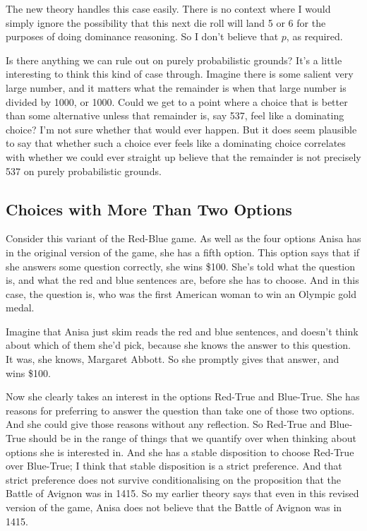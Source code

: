\documentclass[11pt,]{book}
\begin{document}
The new theory handles this case easily. There is no context where I would simply ignore the possibility that this next die roll will land 5 or 6 for the purposes of doing dominance reasoning. So I don't believe that \(p\), as required.

Is there anything we can rule out on purely probabilistic grounds? It's a little interesting to think this kind of case through. Imagine there is some salient very large number, and it matters what the remainder is when that large number is divided by 1000, or 1000. Could we get to a point where a choice that is better than some alternative unless that remainder is, say 537, feel like a dominating choice? I'm not sure whether that would ever happen. But it does seem plausible to say that whether such a choice ever feels like a dominating choice correlates with whether we could ever straight up believe that the remainder is not precisely 537 on purely probabilistic grounds.

\hypertarget{threeway}{%
\subsection{Choices with More Than Two Options}\label{threeway}}

Consider this variant of the Red-Blue game. As well as the four options Anisa has in the original version of the game, she has a fifth option. This option says that if she answers some question correctly, she wins \$100. She's told what the question is, and what the red and blue sentences are, before she has to choose. And in this case, the question is, who was the first American woman to win an Olympic gold medal.

Imagine that Anisa just skim reads the red and blue sentences, and doesn't think about which of them she'd pick, because she knows the answer to this question. It was, she knows, Margaret Abbott. So she promptly gives that answer, and wins \$100.

Now she clearly takes an interest in the options Red-True and Blue-True. She has reasons for preferring to answer the question than take one of those two options. And she could give those reasons without any reflection. So Red-True and Blue-True should be in the range of things that we quantify over when thinking about options she is interested in. And she has a stable disposition to choose Red-True over Blue-True; I think that stable disposition is a strict preference. And that strict preference does not survive conditionalising on the proposition that the Battle of Avignon was in 1415. So my earlier theory says that even in this revised version of the game, Anisa does not believe that the Battle of Avignon was in 1415.
\end{document}
